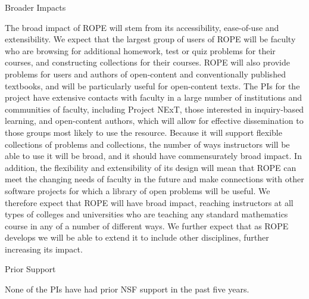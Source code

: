 \documentclass[11pt]{article}
\begin{document}
\begin{section}{Broader Impacts}

The broad impact of ROPE will stem from its accessibility, ease-of-use and
extensibility.  We expect that the largest group of users of ROPE will be
faculty who are browsing for additional homework, test or quiz problems
for their courses, and constructing collections for their courses.  ROPE
will also provide problems for users and authors of open-content and
conventionally published textbooks, and will be particularly useful for
open-content texts.  The PIs for the project have extensive contacts with
faculty in a large number of institutions and communities of faculty,
including Project NExT, those interested in inquiry-based learning, and
open-content authors, which will allow for effective dissemination to
those groups most likely to use the resource.  Because it will support
flexible collections of problems and collections, the number of ways
instructors will be able to use it will be broad, and it should have
commensurately broad impact.  In addition, the flexibility and
extensibility of its design will mean that ROPE can meet the changing
needs of faculty in the future and make connections with other software
projects for which a library of open problems will be useful.  We
therefore expect that ROPE will have broad impact, reaching instructors at
all types of colleges and universities who are teaching any standard
mathematics course in any of a number of different ways.  We further
expect that as ROPE develops we will be able to extend it to include other
disciplines, further increasing its impact.
\end{section}

\begin{section}{Prior Support}

None of the PIs have had prior NSF support in the past five years.

\end{section}
\end{document}
